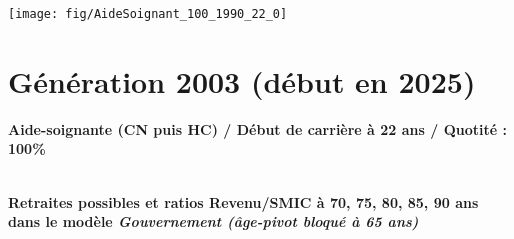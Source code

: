  \vspace{0.1cm} 

 {\hspace{-2.2cm}\texttt{[image: fig/AideSoignant\_100\_1990\_22\_0]}} 

\newpage 
 
\section{Génération 2003 (début en 2025)\label{AideSoignant_100_2003_22_0}} 
 
{\bf \noindent Aide-soignante (CN puis HC) / Début de carrière à 22 ans / Quotité : 100\%}  ~ 

 ~\\{\bf \noindent Retraites possibles et ratios Revenu/SMIC à 70, 75, 80, 85, 90 ans dans le modèle \emph{Gouvernement (âge-pivot bloqué à 65 ans)}}  
 
